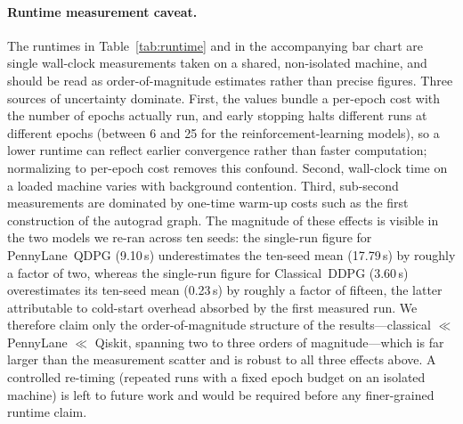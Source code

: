 \paragraph{Runtime measurement caveat.}
The runtimes in Table~\ref{tab:runtime} and in the accompanying bar chart
are single wall-clock measurements taken on a shared, non-isolated
machine, and should be read as order-of-magnitude estimates rather than
precise figures. Three sources of uncertainty dominate. First, the
values bundle a per-epoch cost with the number of epochs actually run,
and early stopping halts different runs at different epochs (between 6
and 25 for the reinforcement-learning models), so a lower runtime can
reflect earlier convergence rather than faster computation; normalizing
to per-epoch cost removes this confound. Second, wall-clock time on a
loaded machine varies with background contention. Third, sub-second
measurements are dominated by one-time warm-up costs such as the first
construction of the autograd graph. The magnitude of these effects is
visible in the two models we re-ran across ten seeds: the single-run
figure for PennyLane~QDPG (9.10\,s) underestimates the ten-seed mean
(17.79\,s) by roughly a factor of two, whereas the single-run figure for
Classical~DDPG (3.60\,s) overestimates its ten-seed mean (0.23\,s) by
roughly a factor of fifteen, the latter attributable to cold-start
overhead absorbed by the first measured run. We therefore claim only the
order-of-magnitude structure of the results---classical
$\ll$ PennyLane $\ll$ Qiskit, spanning two to three orders of
magnitude---which is far larger than the measurement scatter and is
robust to all three effects above. A controlled re-timing (repeated runs
with a fixed epoch budget on an isolated machine) is left to future work
and would be required before any finer-grained runtime claim.
